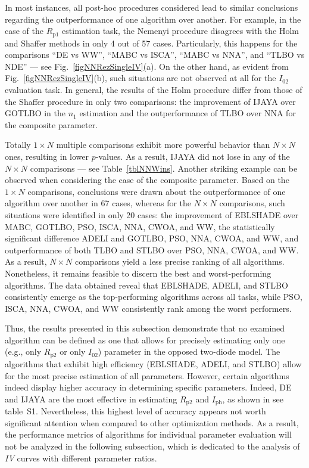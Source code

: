 \documentclass[a4paper,fleqn]{cas-sc}
\begin{document}
In most instances, all post-hoc procedures considered lead to similar conclusions
regarding the outperformance of one algorithm over another.
For example, in the case of the $R_\mathrm{p1}$ estimation task,
the Nemenyi procedure disagrees with the Holm and Shaffer methods in only 4 out of 57 cases.
Particularly, this happens for the comparisons ``DE vs WW'', ``MABC vs ISCA'', ``MABC vs NNA'', and ``TLBO vs NDE'' --- see Fig.~\ref{figNNRezSingleIV}(a).
On the other hand, as evident from Fig.~\ref{figNNRezSingleIV}(b),
such situations are not observed at all for the $I_{02}$ evaluation task.
In general, the results of the Holm procedure differ from those of the Shaffer procedure in only two comparisons:
the improvement of IJAYA over GOTLBO in the $n_1$  estimation and the outperformance of TLBO over NNA for the composite parameter.


Totally $1\times N$ multiple comparisons exhibit more powerful behavior than $N\times N$ ones, resulting in lower $p$-values.
As a result, IJAYA did not lose in any of the $N\times N$ comparisons --- see Table~\ref{tblNNWins}.
Another striking  example can be observed when considering the case of the composite parameter.
Based on the $1\times N$ comparisons, conclusions were drawn about the outperformance of one algorithm over another in 67 cases,
whereas for the $N\times N$ comparisons, such situations were identified in only 20 cases:
the improvement of EBLSHADE over MABC, GOTLBO, PSO, ISCA, NNA, CWOA, and WW,
the statistically significant difference ADELI and GOTLBO, PSO, NNA, CWOA, and WW,
and outperformance of both TLBO and STLBO over PSO, NNA, CWOA, and WW.
As a result, $N\times N$ comparisons yield a less precise ranking of all algorithms.
Nonetheless, it remains feasible to discern the best and worst-performing algorithms.
The data obtained reveal that EBLSHADE, ADELI, and STLBO consistently emerge as the top-performing algorithms across all tasks,
while PSO, ISCA, NNA, CWOA, and WW consistently rank among the worst performers.

Thus, the results presented in this subsection demonstrate that
no examined algorithm can be defined as one that allows for precisely estimating only one
(e.g., only $R_\mathrm{p2}$ or only $I_{02}$) parameter in the opposed two-diode model.
The algorithms that exhibit high efficiency (EBLSHADE, ADELI, and STLBO)
allow for the most precise estimation of all parameters.
However, certain algorithms indeed display higher accuracy in determining specific parameters.
Indeed, DE and IJAYA are the most effective in estimating $R_\mathrm{p2}$ and $I_\mathrm{ph}$, as shown in see table~S1.
Nevertheless, this highest level of accuracy appears not worth significant attention when compared to other optimization methods.
As a result, the performance metrics of algorithms for individual parameter evaluation will not be analyzed in the following subsection,
which is dedicated to the analysis of \emph{IV} curves with different parameter ratios.
\end{document}
